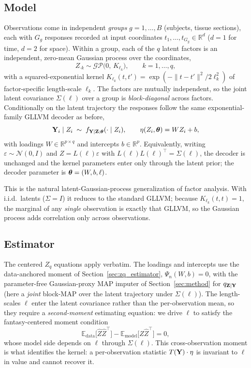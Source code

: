 \documentclass[twoside,11pt]{article}
\begin{document}
\subsection{Model}
Observations come in independent \emph{groups} $g=1,\dots,B$ (subjects, tissue sections), each with $G_g$ responses recorded at input coordinates $t_1,\dots,t_{G_g}\in\mathbb R^d$ ($d=1$ for time, $d=2$ for space). Within a group, each of the $q$ latent factors is an independent, zero-mean Gaussian process over the coordinates,
\[
Z_{\cdot k} \sim \mathcal{GP}\!\big(0,\,K_{\ell_k}\big),\qquad k=1,\dots,q,
\]
with a squared-exponential kernel $K_{\ell_k}(t,t')=\exp(-\|t-t'\|^2/2\ell_k^2)$ of factor-specific length-scale $\ell_k$. The factors are mutually independent, so the joint latent covariance $\Sigma(\ell)$ over a group is \emph{block-diagonal} across factors. Conditionally on the latent trajectory the responses follow the same exponential-family GLLVM decoder as before,
\[
{\bf Y}_i \mid Z_i \;\sim\; f_{{\bf Y}\mid{\bf Z};{\bm{\theta}}}(\cdot\mid Z_i),\qquad \eta(Z_i,{\bm{\theta}})=W Z_i + b,
\]
with loadings $W\in\mathbb R^{p\times q}$ and intercepts $b\in\mathbb R^p$. Equivalently, writing $\varepsilon\sim\mathcal N(0,I)$ and $Z=L(\ell)\varepsilon$ with $L(\ell)L(\ell)^\top=\Sigma(\ell)$, the decoder is unchanged and the kernel parameters enter only through the latent prior; the decoder parameter is ${\bm{\theta}}=(W,b,\ell)$.

This is the natural latent-Gaussian-process generalization of factor analysis. With i.i.d.\ latents ($\Sigma=I$) it reduces to the standard GLLVM; because $K_{\ell_k}(t,t)=1$, the marginal of any \emph{single} observation is exactly that GLLVM, so the Gaussian process adds correlation only across observations.

\subsection{Estimator}
The centered $Z_q$ equations apply verbatim. The loadings and intercepts use the data-anchored moment of Section~\ref{sec:zq_estimator}, $\Psi_n(W,b)=0$, with the parameter-free Gaussian-proxy MAP imputer of Section~\ref{sec:method} for $q_{{\bf Z}\mid{\bf Y}}$ (here a \emph{joint} block-MAP over the latent trajectory under $\Sigma(\ell)$). The length-scales $\ell$ enter the latent covariance rather than the per-observation mean, so they require a \emph{second-moment} estimating equation: we drive $\ell$ to satisfy the fantasy-centered moment condition
\[
\mathbb E_{\mathrm{data}}\!\big[\hat Z\hat Z^\top\big]-\mathbb E_{\mathrm{model}}\!\big[\hat Z\hat Z^\top\big]=0,
\]
whose model side depends on $\ell$ through $\Sigma(\ell)$. This cross-observation moment is what identifies the kernel: a per-observation statistic $T({\bf Y})\cdot\eta$ is invariant to $\ell$ in value and cannot recover it.
\end{document}
